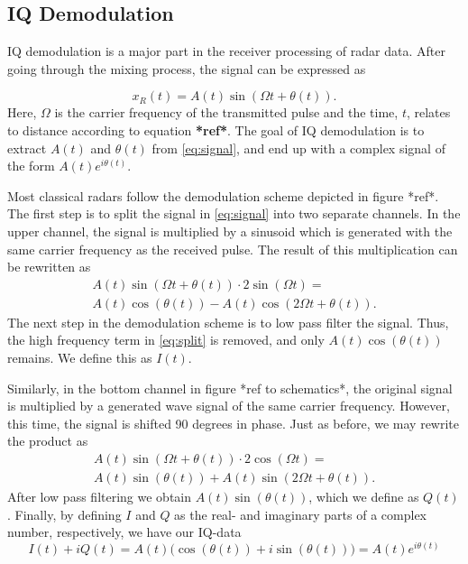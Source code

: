 
\begin{appendices}

\chapter{IQ Demodulation}
IQ demodulation is a major part in the receiver processing of radar data. After going through the mixing process, the signal can be expressed as \citep{lee_1991}

\begin{equation}
\label{eq:signal}
	x_R(t)=A(t)\sin(\Omega t+\theta(t)).
\end{equation}
Here, $\Omega$ is the carrier frequency of the transmitted pulse and the time, $t$, relates to distance according to equation \textbf{*ref*}. The goal of IQ demodulation is to extract $A(t)$ and $\theta(t)$ from \eqref{eq:signal}, and end up with a complex signal of the form $A(t)e^{i\theta(t)}$.

Most classical radars follow the demodulation scheme depicted in figure *ref*. The first step is to split the signal in \eqref{eq:signal} into two separate channels. In the upper channel, the signal is multiplied by a sinusoid which is generated with the same carrier frequency as the received pulse. The result of this multiplication can be rewritten as
\begin{gather}
	 A(t)\sin(\Omega t+\theta(t))\cdot 2\sin(\Omega t) = \\
	\label{eq:split}
 	 A(t)\cos(\theta(t))-A(t)\cos(2\Omega t+\theta(t)).
\end{gather}
The next step in the demodulation scheme is to low pass filter the signal. Thus, the high frequency term in \eqref{eq:split} is removed, and only $A(t)\cos(\theta(t))$ remains. We define this as $I(t)$.

Similarly, in the bottom channel in figure *ref to schematics*, the original signal is multiplied by a generated wave signal of the same carrier frequency. However, this time, the signal is shifted 90 degrees in phase. Just as before, we may rewrite the product as
\begin{gather}
	 A(t)\sin(\Omega t+\theta(t))\cdot 2\cos(\Omega t) = \\
	\label{eq:split2}
 	 A(t)\sin(\theta(t))+A(t)\sin(2\Omega t+\theta(t)).
\end{gather}
After low pass filtering we obtain $A(t)\sin(\theta(t))$, which we define as $Q(t)$. Finally, by defining $I$ and $Q$ as the real- and imaginary parts of a complex number, respectively, we have our IQ-data
\begin{equation}
	I(t)+iQ(t)=A(t)\Big(\cos(\theta(t))+i\sin(\theta(t))\Big)=A(t)e^{i\theta(t)}
\end{equation}




\end{appendices}

